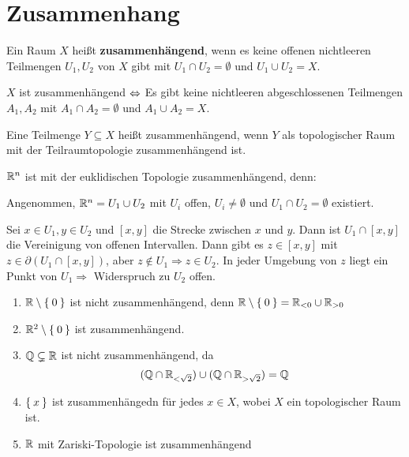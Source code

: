 \section{Zusammenhang}
\begin{definition}
    Ein Raum $X$ heißt \textbf{zusammenhängend}, wenn es keine offenen
    nichtleeren Teilmengen $U_1, U_2$ von $X$ gibt mit $U_1 \cap U_2 = \emptyset$
    und $U_1 \cup U_2 = X$.
\end{definition}

\begin{bemerkung}
    $X$ ist zusammenhängend $\Leftrightarrow$ Es gibt keine nichtleeren abgeschlossenen
    Teilmengen $A_1, A_2$ mit $A_1 \cap A_2 = \emptyset$ und $A_1 \cup A_2 = X$.
\end{bemerkung}

\begin{bemerkung}
    Eine Teilmenge $Y \subseteq X$ heißt zusammenhängend, wenn $Y$
    als topologischer Raum mit der Teilraumtopologie zusammenhängend ist.
\end{bemerkung}

\begin{beispiel}
    $\mathbb{R}^n$ ist mit der euklidischen Topologie zusammenhängend,
    denn:

    Angenommen, $\mathbb{R}^n = U_1 \cup U_2$ mit $U_i$ offen, $U_i \neq \emptyset$
    und $U_1 \cap U_2 = \emptyset$ existiert.

    Sei $x \in U_1, y \in U_2$ und $[x,y]$ die Strecke zwischen $x$
    und $y$. Dann ist $U_1 \cap [x,y]$ die Vereinigung von offenen
    Intervallen. Dann gibt es $z \in [x,y]$ mit $z \in \partial (U_1 \cap [x,y])$,
    aber $z \notin U_1 \Rightarrow z \in U_2$. In jeder Umgebung von 
    $z$ liegt ein Punkt von $U_1 \Rightarrow$ Widerspruch zu $U_2$ offen.
\end{beispiel}

\begin{beispiel}
    \begin{enumerate}
        \item $\mathbb{R} \setminus \Set{0}$ ist nicht zusammenhängend, denn
              $\mathbb{R} \setminus \Set{0} = \mathbb{R}_{< 0} \cup \mathbb{R}_{> 0}$
        \item $\mathbb{R}^2 \setminus \Set{0}$ ist zusammenhängend.
        \item $\mathbb{Q} \subsetneq \mathbb{R}$ ist nicht zusammenhängend, da 
    \[(\mathbb{Q} \cap \mathbb{R}_{< \sqrt{2}}) \cup (\mathbb{Q} \cap \mathbb{R}_{> \sqrt{2}}) = \mathbb{Q}\]
        \item $\Set{x}$ ist zusammenhängedn für jedes $x \in X$, wobei $X$ ein 
              topologischer Raum ist.
        \item $\mathbb{R}$ mit Zariski-Topologie ist zusammenhängend
    \end{enumerate}
\end{beispiel}

